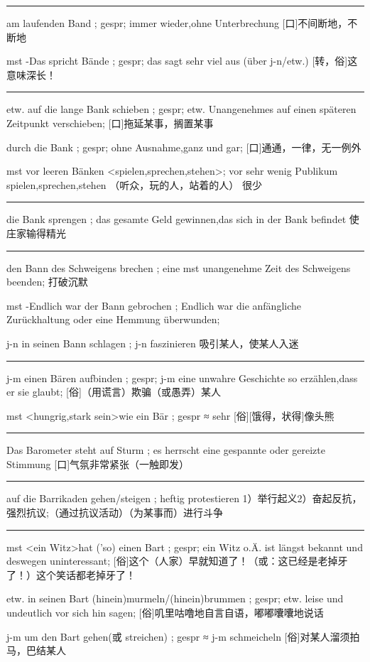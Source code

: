 \noindent\rule{\textwidth}{1pt} 
am laufenden Band ; gespr; immer wieder,ohne Unterbrechung
[口]不间断地，不断地

mst -Das spricht Bände ; gespr; das sagt sehr viel aus (über j-n/etw.)
[转，俗]这意味深长！

\noindent\rule{\textwidth}{1pt} 
etw. auf die lange Bank schieben ; gespr; etw. Unangenehmes auf einen späteren Zeitpunkt verschieben;
[口]拖延某事，搁置某事

durch die Bank ; gespr; ohne Ausnahme,ganz und gar; 
[口]通通，一律，无一例外

mst vor leeren Bänken \textless spielen,sprechen,stehen\textgreater  ; vor sehr wenig Publikum spielen,sprechen,stehen
（听众，玩的人，站着的人） 很少

\noindent\rule{\textwidth}{1pt} 
die Bank sprengen ; das gesamte Geld gewinnen,das sich in der Bank befindet
使庄家输得精光

\noindent\rule{\textwidth}{1pt} 
den Bann des Schweigens brechen ; eine mst unangenehme Zeit des Schweigens beenden;
打破沉默

mst -Endlich war der Bann gebrochen ; Endlich war die anfängliche Zurückhaltung oder eine Hemmung überwunden;

j-n in seinen Bann schlagen ; j-n faszinieren
吸引某人，使某人入迷

\noindent\rule{\textwidth}{1pt} 
j-m einen Bären aufbinden ; gespr; j-m eine unwahre Geschichte so erzählen,dass er sie glaubt;
[俗]（用谎言）欺骗（或愚弄）某人

mst \textless hungrig,stark sein\textgreater  wie ein Bär ; gespr ≈ sehr
[俗][饿得，状得]像头熊

\noindent\rule{\textwidth}{1pt} 
Das Barometer steht auf Sturm ; es herrscht eine gespannte oder gereizte Stimmung
[口]气氛非常紧张（一触即发）

\noindent\rule{\textwidth}{1pt} 
auf die Barrikaden gehen/steigen ; heftig protestieren
1）举行起义2）奋起反抗，强烈抗议;（通过抗议活动）（为某事而）进行斗争

\noindent\rule{\textwidth}{1pt} 
mst \textless ein Witz\textgreater  hat ('so) einen Bart ; gespr; ein Witz o.Ä. ist längst bekannt und deswegen uninteressant;
[俗]这个（人家）早就知道了！（或：这已经是老掉牙了！）这个笑话都老掉牙了！

etw. in seinen Bart (hinein)murmeln/(hinein)brummen ; gespr; etw. leise und undeutlich vor sich hin sagen;
[俗]叽里咕噜地自言自语，嘟嘟囔囔地说话

j-m um den Bart gehen(或 streichen) ; gespr ≈ j-m schmeicheln 
[俗]对某人溜须拍马，巴结某人

